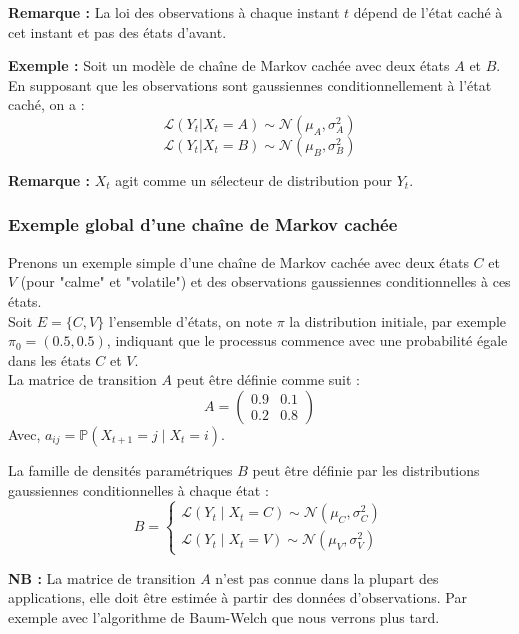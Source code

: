 \documentclass[11pt]{article}
\begin{document}
\textbf{Remarque :}
La loi des observations à chaque instant $t$ dépend de l'état caché à cet instant et pas des états d'avant. 
\vspace{0.3cm}

\textbf{Exemple :}
Soit un modèle de chaîne de Markov cachée avec deux états $A$ et $B$. 
En supposant que les observations sont gaussiennes conditionnellement à l'état caché, on a :
\[
\mathcal{L}(Y_t | {X_t=A}) \sim \mathcal{N}(\mu_{A}, \sigma^2_{A})
\]
\[
\mathcal{L}(Y_t | {X_t=B}) \sim \mathcal{N}(\mu_{B}, \sigma^2_{B})
\]
\vspace{0.3cm}

\textbf{Remarque :}
$X_t$ agit comme un sélecteur de distribution pour $Y_t$.
\vspace{0.3cm}

\subsubsection{Exemple global d'une chaîne de Markov cachée}

Prenons un exemple simple d'une chaîne de Markov cachée avec deux états $C$ et $V$ (pour "calme" et "volatile") et des observations gaussiennes conditionnelles à ces états.\\
Soit $E = \{C, V\}$ l'ensemble d'états, on note $\pi$ la distribution initiale, par exemple $\pi_0 = (0.5, 0.5)$, indiquant que le processus commence avec une probabilité égale dans les états $C$ et $V$.\\
La matrice de transition $A$ peut être définie comme suit :
\[
A =
\begin{pmatrix}
0.9 & 0.1 \\
0.2 & 0.8
\end{pmatrix}
\]
Avec, $a_{ij} = \mathbb{P}(X_{t+1} = j \mid X_t = i)$.

\vspace{0.3cm}

La famille de densités paramétriques $B$ peut être définie par les distributions gaussiennes conditionnelles à chaque état :
\[
B =
\begin{cases}
\mathcal{L}(Y_t \mid X_t = C) \sim \mathcal{N}(\mu_C, \sigma_C^2) \\
\mathcal{L}(Y_t \mid X_t = V) \sim \mathcal{N}(\mu_V, \sigma_V^2)
\end{cases}
\]

\vspace{0.5cm}
\textbf{NB :}
La matrice de transition $A$ n'est pas connue dans la plupart des applications, elle doit être estimée à partir des données d'observations. Par exemple avec l'algorithme de Baum-Welch que nous verrons plus tard.
\vspace{1.5cm}
\end{document}

